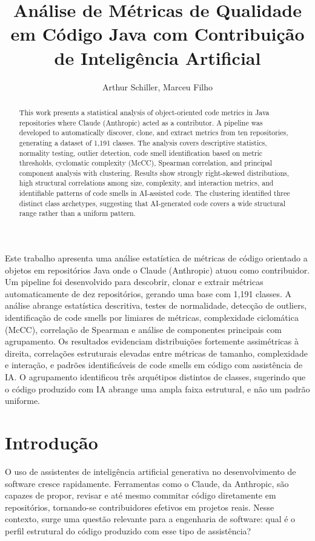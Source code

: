 \documentclass[12pt]{article}
\title{Análise de Métricas de Qualidade em Código Java com Contribuição de Inteligência Artificial}
\author{Arthur Schiller\inst{1}, Marceu Filho\inst{1}}
\begin{document}
\maketitle

\begin{abstract}
This work presents a statistical analysis of object-oriented code metrics in Java repositories where Claude (Anthropic) acted as a contributor. A pipeline was developed to automatically discover, clone, and extract metrics from ten repositories, generating a dataset of 1{,}191 classes. The analysis covers descriptive statistics, normality testing, outlier detection, code smell identification based on metric thresholds, cyclomatic complexity (McCC), Spearman correlation, and principal component analysis with clustering. Results show strongly right-skewed distributions, high structural correlations among size, complexity, and interaction metrics, and identifiable patterns of code smells in AI-assisted code. The clustering identified three distinct class archetypes, suggesting that AI-generated code covers a wide structural range rather than a uniform pattern.
\end{abstract}

\begin{resumo}
Este trabalho apresenta uma análise estatística de métricas de código orientado a objetos em repositórios Java onde o Claude (Anthropic) atuou como contribuidor. Um pipeline foi desenvolvido para descobrir, clonar e extrair métricas automaticamente de dez repositórios, gerando uma base com 1{,}191 classes. A análise abrange estatística descritiva, testes de normalidade, detecção de outliers, identificação de code smells por limiares de métricas, complexidade ciclomática (McCC), correlação de Spearman e análise de componentes principais com agrupamento. Os resultados evidenciam distribuições fortemente assimétricas à direita, correlações estruturais elevadas entre métricas de tamanho, complexidade e interação, e padrões identificáveis de code smells em código com assistência de IA. O agrupamento identificou três arquétipos distintos de classes, sugerindo que o código produzido com IA abrange uma ampla faixa estrutural, e não um padrão uniforme.
\end{resumo}

\section{Introdução}

O uso de assistentes de inteligência artificial generativa no desenvolvimento de software cresce rapidamente. Ferramentas como o Claude, da Anthropic, são capazes de propor, revisar e até mesmo commitar código diretamente em repositórios, tornando-se contribuidores efetivos em projetos reais. Nesse contexto, surge uma questão relevante para a engenharia de software: qual é o perfil estrutural do código produzido com esse tipo de assistência?
\end{document}
